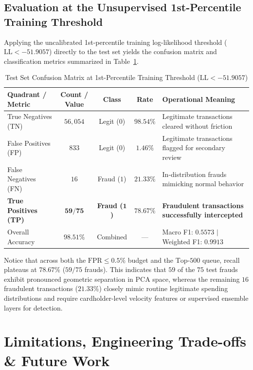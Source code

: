 \documentclass[11pt, a4paper]{article}
\begin{document}
\subsection{Evaluation at the Unsupervised 1st-Percentile Training Threshold}
Applying the uncalibrated 1st-percentile training log-likelihood threshold ($\text{LL} < -51.9057$) directly to the test set yields the confusion matrix and classification metrics summarized in Table~\ref{tab:cm}.

\begin{table}[h!]
\centering
\caption{Test Set Confusion Matrix at 1st-Percentile Training Threshold ($\text{LL} < -51.9057$)}
\vspace{0.2cm}
\renewcommand{\arraystretch}{1.25}
\begin{tabular}{lcccl}
\toprule
\rowcolor{tableheader}
\textbf{Quadrant / Metric} & \textbf{Count / Value} & \textbf{Class} & \textbf{Rate} & \textbf{Operational Meaning} \\
\midrule
True Negatives (TN) & $56,054$ & Legit ($0$) & $98.54\%$ & Legitimate transactions cleared without friction \\
\rowcolor{rowalt}
False Positives (FP) & $833$ & Legit ($0$) & $1.46\%$ & Legitimate transactions flagged for secondary review \\
False Negatives (FN) & $16$ & Fraud ($1$) & $21.33\%$ & In-distribution frauds mimicking normal behavior \\
\rowcolor{rowalt}
\textbf{True Positives (TP)} & $\mathbf{59 / 75}$ & \textbf{Fraud ($\mathbf{1}$)} & $\mathbf{78.67\%}$ & \textbf{Fraudulent transactions successfully intercepted} \\
\midrule
Overall Accuracy & $98.51\%$ & Combined & --- & Macro F1: $0.5573$ $\mid$ Weighted F1: $0.9913$ \\
\bottomrule
\end{tabular}
\label{tab:cm}
\end{table}

Notice that across both the $\text{FPR} \le 0.5\%$ budget and the $\text{Top-}500$ queue, recall plateaus at $78.67\%$ ($59 / 75$ frauds). This indicates that $59$ of the $75$ test frauds exhibit pronounced geometric separation in PCA space, whereas the remaining $16$ fraudulent transactions ($21.33\%$) closely mimic routine legitimate spending distributions and require cardholder-level velocity features or supervised ensemble layers for detection.

\section{Limitations, Engineering Trade-offs \& Future Work}
\end{document}
